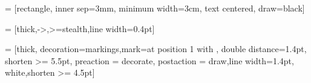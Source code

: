 
\usetikzlibrary{shapes.geometric, arrows, positioning, decorations.markings}

 = [rectangle, inner sep=3mm, minimum width=3cm, text centered, draw=black]

 = [thick,->,>=stealth,line width=0.4pt]

 = [thick, decoration={markings,mark=at position
   1 with {}},
   double distance=1.4pt, shorten >= 5.5pt,
   preaction = {decorate},
   postaction = {draw,line width=1.4pt, white,shorten >= 4.5pt}]
